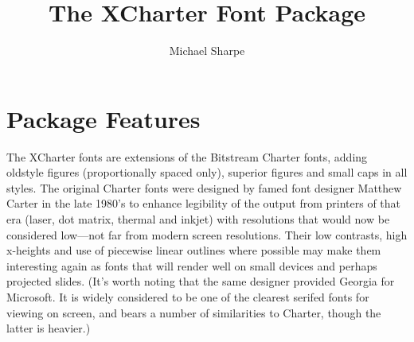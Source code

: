 \documentclass[11pt]{article}
\title{The XCharter Font Package}
\author{Michael Sharpe}
\begin{document}
\maketitle


\section{Package Features}
The XCharter fonts are extensions of the Bitstream Charter fonts, adding oldstyle figures (proportionally spaced only), superior figures and small caps in all styles. The original Charter fonts were designed by famed font designer Matthew Carter in the late 1980's to enhance legibility of the output from printers of that era (laser, dot matrix, thermal and inkjet) with resolutions that would now be considered low---not far from modern screen resolutions. Their low contrasts, high x-heights and use of piecewise linear outlines where possible may make them interesting again as fonts that will render well on small devices and perhaps projected slides. (It's worth noting that the same designer provided Georgia for Microsoft. It is widely considered to be one of the clearest serifed fonts for viewing on screen, and bears a number of similarities to Charter, though the latter is  heavier.)
\end{document}
